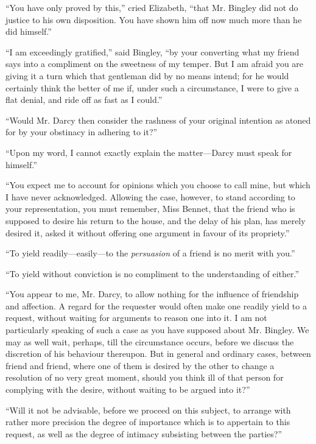 ``You have only proved by this,'' cried Elizabeth, ``that Mr. Bingley did not do justice to his own disposition. You have shown him off now much more than he did himself.''

``I am exceedingly gratified,'' said Bingley, ``by your converting what my friend says into a compliment on the sweetness of my temper. But I am afraid you are giving it a turn which that gentleman did by no means intend; for he would certainly think the better of me if, under such a circumstance, I were to give a flat denial, and ride off as fast as I could.''

``Would Mr. Darcy then consider the rashness of your original intention as atoned for by your obstinacy in adhering to it?''

``Upon my word, I cannot exactly explain the matter---Darcy must speak for himself.''

``You expect me to account for opinions which you choose to call mine, but which I have never acknowledged. Allowing the case, however, to stand according to your representation, you must remember, Miss Bennet, that the friend who is supposed to desire his return to the house, and the delay of his plan, has merely desired it, asked it without offering one argument in favour of its propriety.''

``To yield readily---easily---to the \textit{persuasion} of a friend is no merit with you.''

``To yield without conviction is no compliment to the understanding of either.''

``You appear to me, Mr. Darcy, to allow nothing for the influence of friendship and affection. A regard for the requester would often make one readily yield to a request, without waiting for arguments to reason one into it. I am not particularly speaking of such a case as you have supposed about Mr. Bingley. We may as well wait, perhaps, till the circumstance occurs, before we discuss the discretion of his behaviour thereupon. But in general and ordinary cases, between friend and friend, where one of them is desired by the other to change a resolution of no very great moment, should you think ill of that person for complying with the desire, without waiting to be argued into it?''

``Will it not be advisable, before we proceed on this subject, to arrange with rather more precision the degree of importance which is to appertain to this request, as well as the degree of intimacy subsisting between the parties?''

